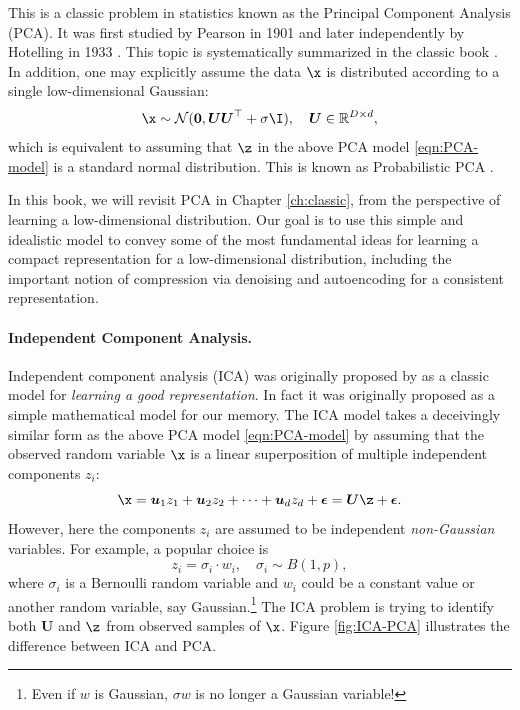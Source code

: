 \documentclass[../../book-main.tex]{subfiles}
\begin{document}
This is a classic problem in statistics known as the Principal Component Analysis (PCA). It was first studied by Pearson in 1901 \cite{Pearson1901} and later independently by Hotelling in 1933 \cite{Hotelling1933}. This topic is systematically summarized in the classic book \cite{Jolliffe1986,JolliffeI2002}.
In addition, one may explicitly assume the data $\x$ is distributed according to a single low-dimensional Gaussian:
\begin{equation}
    \x \sim \mathcal{N}(\boldsymbol{0}, \boldsymbol{U}\boldsymbol{U}^\top + \sigma \I), \quad \boldsymbol{U} \in \mathbb{R}^{D\times d},
\end{equation}
which is equivalent to assuming that  $\z$ in the above PCA model \eqref{eqn:PCA-model} is a standard normal distribution. 
This is known as Probabilistic PCA \cite{TippingM1999}. 

In this book, we will revisit  PCA in Chapter \ref{ch:classic}, from the perspective of learning a low-dimensional distribution. Our goal is to use this simple and idealistic model to convey some of the most fundamental ideas for learning a compact representation for a low-dimensional distribution, including the important notion of compression via denoising and autoencoding for a consistent representation.

\paragraph{Independent Component Analysis.}
Independent component analysis (ICA) was originally proposed by \cite{Ans-1985} as a classic model for {\em learning a good representation}. In fact it was originally proposed as a simple mathematical model for our memory. The ICA model takes a deceivingly similar form as the above PCA model \eqref{eqn:PCA-model} by assuming that the observed random variable $\x$ is a linear superposition of multiple independent components $z_i$:
\begin{equation}
    \x = \boldsymbol{u}_1 z_1 + \boldsymbol{u}_2 z_2 + \cdots + \boldsymbol{u}_d z_d  + \boldsymbol{\epsilon} =  \boldsymbol{U} \z + \boldsymbol{\epsilon}.
    \label{eqn:ICA-model}
\end{equation}
However, here the components $z_i$ are assumed to be independent {\em non-Gaussian} variables. For example, a popular choice is
\begin{equation}
    z_i = \sigma_i \cdot w_i, \quad \sigma_i \sim B(1,p),
    \label{eqn:ICA-modes}
\end{equation}
where $\sigma_i$ is a Bernoulli random variable and $w_i$ could be a constant value or another random variable, say Gaussian.\footnote{Even if $w$ is Gaussian, $\sigma w$ is no longer a Gaussian variable!}  The ICA problem is trying to identify both $\boldsymbol{U}$ and $\z$ from observed samples of $\x$. Figure \ref{fig:ICA-PCA} illustrates the difference between ICA and PCA.
\end{document}
